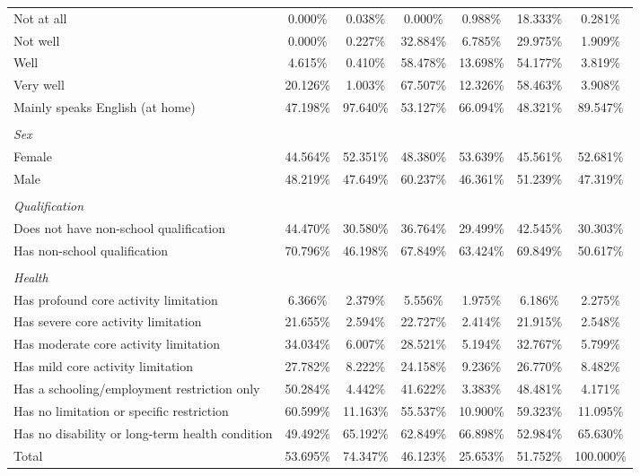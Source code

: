 \begin{longtable}{l*6c}
  Not at all
  & 0.000\%  & 0.038\%   & 0.000\%  & 0.988\%  & 18.333\% & 0.281\%  \\
  Not well
  & 0.000\%  & 0.227\%   & 32.884\% & 6.785\%  & 29.975\% & 1.909\%  \\
  Well
  & 4.615\%  & 0.410\%   & 58.478\% & 13.698\% & 54.177\% & 3.819\%  \\
  Very well
  & 20.126\% & 1.003\%   & 67.507\% & 12.326\% & 58.463\% & 3.908\%  \\
  Mainly speaks English (at home)
  & 47.198\% & 97.640\%  & 53.127\% & 66.094\% & 48.321\% & 89.547\% \\
  \\
  \multicolumn{7}{l}{\textit{Sex}} \\ \hline
  Female
  & 44.564\% & 52.351\%  & 48.380\% & 53.639\% & 45.561\% & 52.681\% \\
  Male
  & 48.219\% & 47.649\%  & 60.237\% & 46.361\% & 51.239\% & 47.319\% \\
  \\
  \multicolumn{7}{l}{\textit{Qualification}} \\ \hline
  Does not have non-school qualification
  & 44.470\% & 30.580\%  & 36.764\% & 29.499\% & 42.545\% & 30.303\% \\
  Has non-school qualification
  & 70.796\% & 46.198\%  & 67.849\% & 63.424\% & 69.849\% & 50.617\% \\
  \\
  \multicolumn{7}{l}{\textit{Health}} \\ \hline
  Has profound core activity limitation
  & 6.366\%  & 2.379\%   & 5.556\%  & 1.975\%  & 6.186\%  & 2.275\%  \\
  Has severe core activity limitation
  & 21.655\% & 2.594\%   & 22.727\% & 2.414\%  & 21.915\% & 2.548\%  \\
  Has moderate core activity limitation
  & 34.034\% & 6.007\%   & 28.521\% & 5.194\%  & 32.767\% & 5.799\%  \\
  Has mild core activity limitation
  & 27.782\% & 8.222\%   & 24.158\% & 9.236\%  & 26.770\% & 8.482\%  \\
  Has a schooling/employment restriction   only
  & 50.284\% & 4.442\%   & 41.622\% & 3.383\%  & 48.481\% & 4.171\%  \\
  Has no limitation or specific   restriction
  & 60.599\% & 11.163\%  & 55.537\% & 10.900\% & 59.323\% & 11.095\% \\
  Has no disability or long-term health   condition
  & 49.492\% & 65.192\%  & 62.849\% & 66.898\% & 52.984\% & 65.630\% \\
  \hline
  Total & 53.695\% & 74.347\% & 46.123\% &25.653\% & 51.752\% & 100.000\%  \\
\end{longtable}